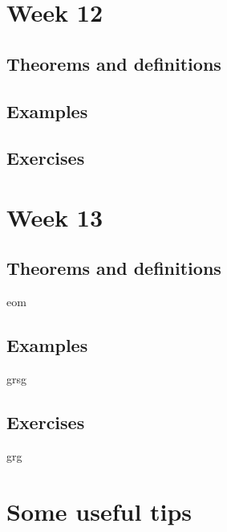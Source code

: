 \documentclass[12pt,a4paper]{article}
\begin{document}
\section{Week 12}
\subsection{Theorems and definitions}
\subsection{Examples}
\subsection{Exercises}
\section{Week 13}
\subsection{Theorems and definitions}
eom
\subsection{Examples}
grsg
\subsection{Exercises}
grg




\appendix
\section{Some useful tips}
\end{document}
